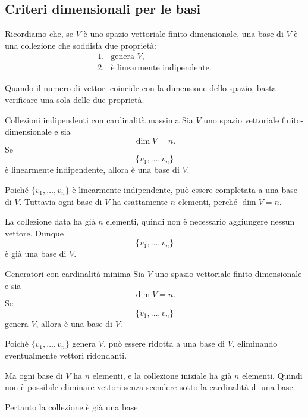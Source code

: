\documentclass[a4paper]{article}
\begin{document}
\subsection{Criteri dimensionali per le basi}

Ricordiamo che, se \(V\) è uno spazio vettoriale finito-dimensionale, una base di \(V\) è una collezione che soddisfa due proprietà:
\[
    \begin{array}{ll}
        \text{1.} & \text{genera } V,\\
        \text{2.} & \text{è linearmente indipendente}.
    \end{array}
\]

Quando il numero di vettori coincide con la dimensione dello spazio, basta verificare una sola delle due proprietà.

\begin{snippetproposition}{Collezioni indipendenti con cardinalità massima}
    Sia \(V\) uno spazio vettoriale finito-dimensionale e sia
    \[
        \dim V=n.
    \]
    Se
    \[
        \{v_1,\ldots,v_n\}
    \]
    è linearmente indipendente, allora è una base di \(V\).
\end{snippetproposition}

\begin{snippetproof}{}
    Poiché \(\{v_1,\ldots,v_n\}\) è linearmente indipendente, può essere completata a una base di \(V\). Tuttavia ogni base di \(V\) ha esattamente \(n\) elementi, perché \(\dim V=n\).

    La collezione data ha già \(n\) elementi, quindi non è necessario aggiungere nessun vettore. Dunque
    \[
        \{v_1,\ldots,v_n\}
    \]
    è già una base di \(V\).
\end{snippetproof}

\begin{snippetproposition}{Generatori con cardinalità minima}
    Sia \(V\) uno spazio vettoriale finito-dimensionale e sia
    \[
        \dim V=n.
    \]
    Se
    \[
        \{v_1,\ldots,v_n\}
    \]
    genera \(V\), allora è una base di \(V\).
\end{snippetproposition}

\begin{snippetproof}{}
    Poiché \(\{v_1,\ldots,v_n\}\) genera \(V\), può essere ridotta a una base di \(V\), eliminando eventualmente vettori ridondanti.

    Ma ogni base di \(V\) ha \(n\) elementi, e la collezione iniziale ha già \(n\) elementi. Quindi non è possibile eliminare vettori senza scendere sotto la cardinalità di una base.

    Pertanto la collezione è già una base.
\end{snippetproof}
\end{document}
